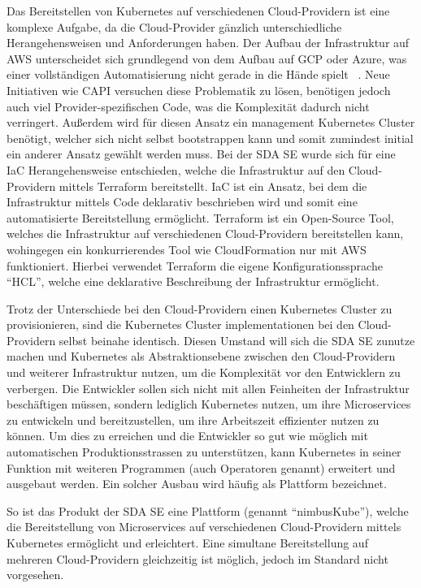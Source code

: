 Das Bereitstellen von Kubernetes auf verschiedenen Cloud-Providern ist eine komplexe Aufgabe, da die Cloud-Provider gänzlich unterschiedliche Herangehensweisen und Anforderungen haben.
Der Aufbau der Infrastruktur auf AWS unterscheidet sich grundlegend von dem Aufbau auf GCP oder Azure, was einer vollständigen Automatisierung nicht gerade in die Hände spielt ~\cite[p.~450]{khot2020comparative}.
Neue Initiativen wie \ac{CAPI} versuchen diese Problematik zu lösen, benötigen jedoch auch viel Provider-spezifischen Code, was die Komplexität dadurch nicht verringert.
Außerdem wird für diesen Ansatz ein management Kubernetes Cluster benötigt, welcher sich nicht selbst bootstrappen kann und somit zumindest initial ein anderer Ansatz gewählt werden muss.
Bei der SDA SE wurde sich für eine \ac{IaC} Herangehensweise entschieden, welche die Infrastruktur auf den Cloud-Providern mittels Terraform bereitstellt.
IaC ist ein Ansatz, bei dem die Infrastruktur mittels Code deklarativ beschrieben wird und somit eine automatisierte Bereitstellung ermöglicht.
Terraform ist ein Open-Source Tool, welches die Infrastruktur auf verschiedenen Cloud-Providern bereitstellen kann, wohingegen ein konkurrierendes Tool wie CloudFormation nur mit AWS funktioniert.
Hierbei verwendet Terraform die eigene Konfigurationssprache \enquote{HCL}, welche eine deklarative Beschreibung der Infrastruktur ermöglicht.
\medskip

Trotz der Unterschiede bei den Cloud-Providern einen Kubernetes Cluster zu provisionieren, sind die Kubernetes Cluster implementationen bei den Cloud-Providern selbst beinahe identisch.
Diesen Umstand will sich die SDA SE zunutze machen und Kubernetes als Abstraktionsebene zwischen den Cloud-Providern und weiterer Infrastruktur nutzen, um die Komplexität vor den Entwicklern zu verbergen.
Die Entwickler sollen sich nicht mit allen Feinheiten der Infrastruktur beschäftigen müssen, sondern lediglich Kubernetes nutzen, um ihre Microservices zu entwickeln und bereitzustellen, um ihre Arbeitszeit effizienter nutzen zu können.
Um dies zu erreichen und die Entwickler so gut wie möglich mit automatischen Produktionsstrassen zu unterstützen, kann Kubernetes in seiner Funktion mit weiteren Programmen (auch Operatoren genannt) erweitert und ausgebaut werden.
Ein solcher Ausbau wird häufig als Plattform bezeichnet.
\medskip

So ist das Produkt der SDA SE eine Plattform (genannt \enquote{nimbusKube}), welche die Bereitstellung von Microservices auf verschiedenen Cloud-Providern mittels Kubernetes ermöglicht und erleichtert.
Eine simultane Bereitstellung auf mehreren Cloud-Providern gleichzeitig ist möglich, jedoch im Standard nicht vorgesehen.

